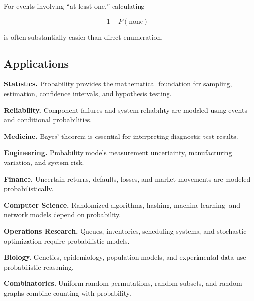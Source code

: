 For events involving ``at least one,'' calculating

\[
1-P(\text{none})
\]

is often substantially easier than direct enumeration.

\subsection{Applications}
\label{subsec:elementary-probability-applications}

\begin{applicationbox}

\textbf{Statistics.}
Probability provides the mathematical foundation for sampling,
estimation, confidence intervals, and hypothesis testing.

\medskip

\textbf{Reliability.}
Component failures and system reliability are modeled using events and
conditional probabilities.

\medskip

\textbf{Medicine.}
Bayes' theorem is essential for interpreting diagnostic-test results.

\medskip

\textbf{Engineering.}
Probability models measurement uncertainty, manufacturing variation,
and system risk.

\medskip

\textbf{Finance.}
Uncertain returns, defaults, losses, and market movements are modeled
probabilistically.

\medskip

\textbf{Computer Science.}
Randomized algorithms, hashing, machine learning, and network models
depend on probability.

\medskip

\textbf{Operations Research.}
Queues, inventories, scheduling systems, and stochastic optimization
require probabilistic models.

\medskip

\textbf{Biology.}
Genetics, epidemiology, population models, and experimental data use
probabilistic reasoning.

\medskip

\textbf{Combinatorics.}
Uniform random permutations, random subsets, and random graphs combine
counting with probability.

\end{applicationbox}

